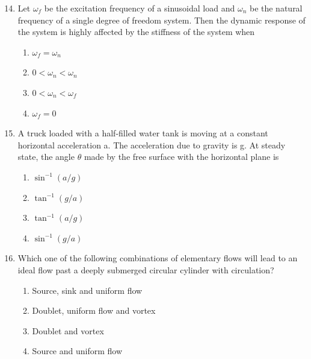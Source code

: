 \documentclass[journal]{IEEEtran}
\theoremstyle{remark}
\begin{document}
\begin{enumerate}[itemsep=1em]
\setcounter{enumi}{13}
\item Let $\omega_f$ be the excitation frequency of a sinusoidal load and $\omega_n$ be the natural frequency of a single degree of freedom system. Then the dynamic response of the system is highly affected by the stiffness of the system when 
\begin{multicols}{4}
\begin{enumerate}
    \item $\omega_f=\omega_n$
    \item $0<\omega_n<\omega_n$
    \item $0<\omega_n<\omega_f$
    \item $\omega_f=0$
\end{enumerate}
\end{multicols}
\end{enumerate}

\begin{enumerate}[itemsep=1em]
\setcounter{enumi}{14}
\item A truck loaded with a half-filled water tank is moving at a constant horizontal acceleration a. The acceleration due to gravity is g. At steady state, the angle $\theta$ made by the free surface with the horizontal plane is
\begin{multicols}{4}
\begin{enumerate}
    \item $\sin^{-1}(a/g)$
    \item $\tan^{-1}(g/a)$
    \item $\tan^{-1}(a/g)$
    \item $\sin^{-1}(g/a)$
\end{enumerate}
\end{multicols}
\end{enumerate}

\newpage
\vspace*{0.25cm}

\begin{enumerate}[itemsep=1em]
\setcounter{enumi}{15}
\item Which one of the following combinations of elementary flows will lead to an ideal flow past a deeply submerged circular cylinder with circulation?
\begin{enumerate}[leftmargin=2.5em, labelsep=0.5em, itemsep=0.5em]
    \item Source, sink and uniform flow 
    \item Doublet, uniform flow and vortex 
    \item Doublet and vortex 
    \item Source and uniform flow 
\end{enumerate}
\end{enumerate}
\end{document}
